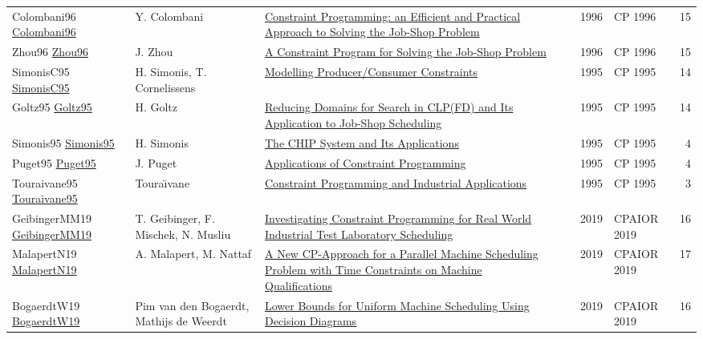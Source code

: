{\begin{longtable}{p{3cm}p{6cm}p{7cm}rrrp{3cm}r}
Colombani96 \href{https://doi.org/10.1007/3-540-61551-2\_72}{Colombani96} & Y. Colombani & \href{papers/Colombani96.pdf}{Constraint Programming: an Efficient and Practical Approach to Solving the Job-Shop Problem} &  & \cite{Colombani96} & 1996 & CP 1996 & 15\\
Zhou96 \href{https://doi.org/10.1007/3-540-61551-2\_97}{Zhou96} & J. Zhou & \href{papers/Zhou96.pdf}{A Constraint Program for Solving the Job-Shop Problem} &  & \cite{Zhou96} & 1996 & CP 1996 & 15\\
SimonisC95 \href{https://doi.org/10.1007/3-540-60299-2\_27}{SimonisC95} & H. Simonis, T. Cornelissens & \href{papers/SimonisC95.pdf}{Modelling Producer/Consumer Constraints} &  & \cite{SimonisC95} & 1995 & CP 1995 & 14\\
Goltz95 \href{https://doi.org/10.1007/3-540-60299-2\_33}{Goltz95} & H. Goltz & \href{papers/Goltz95.pdf}{Reducing Domains for Search in {CLP(FD)} and Its Application to Job-Shop Scheduling} &  & \cite{Goltz95} & 1995 & CP 1995 & 14\\
Simonis95 \href{https://doi.org/10.1007/3-540-60299-2\_42}{Simonis95} & H. Simonis & \href{papers/Simonis95.pdf}{The {CHIP} System and Its Applications} &  & \cite{Simonis95} & 1995 & CP 1995 & 4\\
Puget95 \href{https://doi.org/10.1007/3-540-60299-2\_43}{Puget95} & J. Puget & \href{papers/Puget95.pdf}{Applications of Constraint Programming} &  & \cite{Puget95} & 1995 & CP 1995 & 4\\
Touraivane95 \href{https://doi.org/10.1007/3-540-60299-2\_41}{Touraivane95} & Toura{\"{\i}}vane & \href{papers/Touraivane95.pdf}{Constraint Programming and Industrial Applications} &  & \cite{Touraivane95} & 1995 & CP 1995 & 3\\
GeibingerMM19 \href{https://doi.org/10.1007/978-3-030-19212-9\_20}{GeibingerMM19} & T. Geibinger, F. Mischek, N. Musliu & \href{papers/GeibingerMM19.pdf}{Investigating Constraint Programming for Real World Industrial Test Laboratory Scheduling} &  & \cite{GeibingerMM19} & 2019 & CPAIOR 2019 & 16\\
MalapertN19 \href{https://doi.org/10.1007/978-3-030-19212-9\_28}{MalapertN19} & A. Malapert, M. Nattaf & \href{papers/MalapertN19.pdf}{A New CP-Approach for a Parallel Machine Scheduling Problem with Time Constraints on Machine Qualifications} &  & \cite{MalapertN19} & 2019 & CPAIOR 2019 & 17\\
BogaerdtW19 \href{https://doi.org/10.1007/978-3-030-19212-9\_38}{BogaerdtW19} & Pim van den Bogaerdt, Mathijs de Weerdt & \href{papers/BogaerdtW19.pdf}{Lower Bounds for Uniform Machine Scheduling Using Decision Diagrams} &  & \cite{BogaerdtW19} & 2019 & CPAIOR 2019 & 16\\

\end{longtable}}

